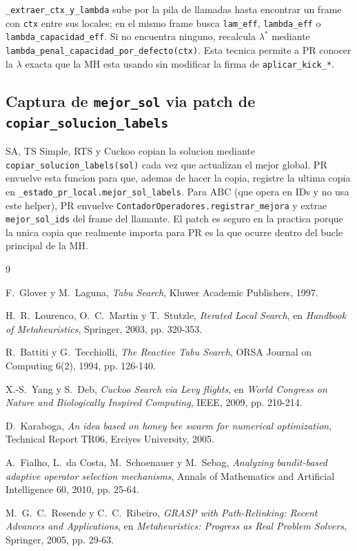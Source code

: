 \documentclass[11pt,a4paper]{article}
\newcommand{\mh}{MH}
\newcommand{\code}[1]{\texttt{#1}}
\begin{document}
\code{\_extraer\_ctx\_y\_lambda} sube por la pila de llamadas hasta
encontrar un frame con \code{ctx} entre sus locales; en el mismo
frame busca \code{lam\_eff}, \code{lambda\_eff} o
\code{lambda\_capacidad\_eff}. Si no encuentra ninguno, recalcula
$\lambda^*$ mediante \code{lambda\_penal\_capacidad\_por\_defecto(ctx)}.
Esta tecnica permite a PR conocer la $\lambda$ exacta que la \mh{}
esta usando sin modificar la firma de \code{aplicar\_kick\_*}.

\subsection{Captura de \code{mejor\_sol} via patch de \code{copiar\_solucion\_labels}}

SA, TS Simple, RTS y Cuckoo copian la solucion mediante
\code{copiar\_solucion\_labels(sol)} cada vez que actualizan el mejor
global. PR envuelve esta funcion para que, ademas de hacer la copia,
registre la ultima copia en \code{\_estado\_pr\_local.mejor\_sol\_labels}.
Para ABC (que opera en IDs y no usa este helper), PR envuelve
\code{ContadorOperadores.registrar\_mejora} y extrae
\code{mejor\_sol\_ids} del frame del llamante. El patch es seguro en
la practica porque la unica copia que realmente importa para PR es la
que ocurre dentro del bucle principal de la \mh{}.

\begin{thebibliography}{9}

F.~Glover y M.~Laguna,
\emph{Tabu Search},
Kluwer Academic Publishers, 1997.

H.~R.~Lourenco, O.~C.~Martin y T.~Stutzle,
\emph{Iterated Local Search},
en \emph{Handbook of Metaheuristics}, Springer, 2003, pp. 320-353.

R.~Battiti y G.~Tecchiolli,
\emph{The Reactive Tabu Search},
ORSA Journal on Computing 6(2), 1994, pp. 126-140.

X.-S.~Yang y S.~Deb,
\emph{Cuckoo Search via Levy flights},
en \emph{World Congress on Nature and Biologically Inspired Computing},
IEEE, 2009, pp. 210-214.

D.~Karaboga,
\emph{An idea based on honey bee swarm for numerical optimization},
Technical Report TR06, Erciyes University, 2005.

A.~Fialho, L.~da Costa, M.~Schoenauer y M.~Sebag,
\emph{Analyzing bandit-based adaptive operator selection mechanisms},
Annals of Mathematics and Artificial Intelligence 60, 2010,
pp. 25-64.

M.~G.~C.~Resende y C.~C.~Ribeiro,
\emph{GRASP with Path-Relinking: Recent Advances and Applications},
en \emph{Metaheuristics: Progress as Real Problem Solvers}, Springer,
2005, pp. 29-63.

\end{thebibliography}
\end{document}
